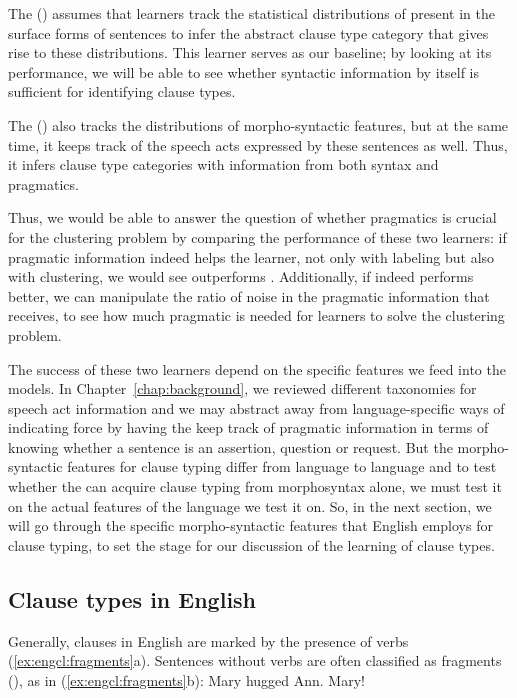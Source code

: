 The \tbf{\distlearner{}} (\dlearnerabbr{}) assumes that learners track the statistical distributions of  present in the surface forms of sentences to infer the abstract clause type category that gives rise to these distributions. This learner serves as our baseline; by looking at its performance, we will be able to see whether syntactic information by itself is sufficient for identifying clause types. 

The \tbf{\praglearner{}} (\plearnerabbr{}) also tracks the distributions of morpho-syntactic features, but at the same time, it keeps track of the speech acts expressed by these sentences as well. Thus, it infers clause type categories with information from both syntax and pragmatics. 

Thus, we would be able to answer the question of whether pragmatics is crucial for the clustering problem by comparing the performance of these two learners: if pragmatic information indeed helps the learner, not only with labeling but also with clustering, we would see \plearnerabbr{} outperforms \dlearnerabbr. Additionally, if \plearnerabbr{} indeed performs better, we can manipulate the ratio of noise in the pragmatic information that \plearnerabbr{} receives, to see how much pragmatic is needed for learners to solve the clustering problem. 


The success of these two learners depend on the specific features we feed into the models. In Chapter~\ref{chap:background}, we reviewed different taxonomies for speech act information and we may abstract away from language-specific ways of indicating force by having the \plearnerabbr{} keep track of pragmatic information in terms of knowing whether a sentence is an assertion, question or request. But the morpho-syntactic features for clause typing differ from language to language and to test whether the \dlearnerabbr{} can acquire clause typing from morphosyntax alone, we must test it on the actual features of the language we test it on. So, in the next section, we will go through the specific morpho-syntactic features that English employs for clause typing, to set the stage for our discussion of the learning of clause types. 


\subsection{Clause types in English} \label{sec:engcl:bg:grammar}

Generally, clauses in English are marked by the presence of verbs (\ref{ex:engcl:fragments}a). Sentences without verbs are often classified as fragments (\cite{sz1985speechact}), as in (\ref{ex:engcl:fragments}b):
\bxl{}
Mary hugged Ann.
\ex
Mary!
\exl
\eex

